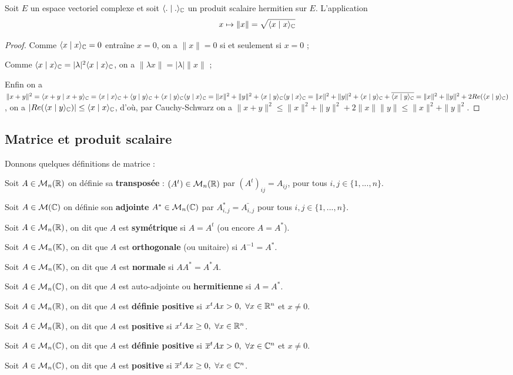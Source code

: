 Soit $E$ un espace vectoriel complexe et soit  $\langle.\mid.\rangle_{\mathbb{C}}$ un produit scalaire hermitien sur $E$. L'application $$x \mapsto \|x\| = \sqrt{\langle x \mid x\rangle_{\mathbb{C}}}$$
\ep
\begin{proof}
	\ben
		\item Comme $\langle x \mid x\rangle_{\mathbb{C}} = 0$ entraîne $x=0$, on a $\|x\|=0$ si et seulement si $x=0$ ;  
		\item Comme $\langle x \mid x\rangle_{\mathbb{C}} = |\lambda |^2\langle x \mid x\rangle_{\mathbb{C}}$, on a $\|\lambda x \| = |\lambda| \|x\|$ ; 
		\item Enfin on a $\|x + y \| ^2 = \langle x+y \mid x+y \rangle_{\mathbb{C}} = \langle x \mid x\rangle_{\mathbb{C}} + \langle y \mid y\rangle_{\mathbb{C}} + \langle x \mid y\rangle_{\mathbb{C}}\langle y \mid x\rangle_{\mathbb{C}} = \|x\|^2 + \|y\| ^2 + \langle x \mid y\rangle_{\mathbb{C}}\langle y \mid x\rangle_{\mathbb{C}} = \|x\|^2 + \|y\|^2 + \langle x \mid y\rangle_{\mathbb{C}}+\overline{\langle x \mid y\rangle_{\mathbb{C}}} = \|x\|^2 + \| y \| ^2 + 2Re(\langle x \mid y\rangle_{\mathbb{C}})$, on a $|Re(\langle x \mid y\rangle_{\mathbb{C}})| \leq \langle x \mid x\rangle_{\mathbb{C}}$, d'où, par Cauchy-Schwarz on a $\|x+y\|^2 \leq \|x\|^2 + \|y\|^2 + 2 \|x\| \|y\| \leq \|x\|^2 +\|y\|^2$.
	\een
\end{proof}

\subsection{Matrice et produit scalaire}
\bd
Donnons quelques définitions de matrice :
\ben
	\item Soit $A \in \mathcal{M}_n(\mathbb{R})$ on définie sa \textbf{transposée} :  $(A^t) \in  \mathcal{M}_n(\mathbb{R})$ par $(A^t)_{ij} = A_{ij}$, pour tous $i,j \in\{1,...,n\}$.
	\item Soit $A \in \mathcal{M}(\mathbb{C})$ on définie son \textbf{adjointe} $A^* \in \mathcal{M}_n(\mathbb{C})$ par $A^*_{i,j} = \bar{A_{i,j}}$ pour tous $i,j \in \{1,...,n\}$.
	\item Soit $A \in \mathcal{M}_n(\mathbb{R})$, on dit que $A$ est \textbf{symétrique} si $A = A^t$ (ou encore $A = A^*$).
	\item Soit $A \in \mathcal{M}_n(\mathbb{K})$, on dit que $A$ est \textbf{orthogonale} (ou unitaire) si $A^{-1} = A^*$.
	\item Soit $A \in \mathcal{M}_n(\mathbb{K})$, on dit que $A$ est \textbf{normale} si $AA^* = A^*A$.
	\item Soit $A \in \mathcal{M}_n(\mathbb{C})$, on dit que $A$ est auto-adjointe ou \textbf{hermitienne} si $A = A^*$. 
	\item Soit $A \in \mathcal{M}_n(\mathbb{R})$, on dit que $A$ est \textbf{définie positive} si $x^tAx > 0, ~ \forall x \in \mathbb{R}^n$ et $x\ne 0$.
	\item Soit $A \in \mathcal{M}_n(\mathbb{R})$, on dit que $A$ est \textbf{positive} si $x^tAx \geq 0, ~ \forall x \in \mathbb{R}^n$.
	\item Soit $A \in \mathcal{M}_n(\mathbb{C})$, on dit que $A$ est \textbf{définie positive} si $\overline{x}^tAx > 0, ~ \forall x \in \mathbb{C}^n$ et $x \ne 0$.
	\item Soit $A \in \mathcal{M}_n(\mathbb{C})$, on dit que $A$ est \textbf{positive} si $\overline{x}^t A x \geq 0, ~ \forall x \in \mathbb{C}^n$.
\een
\ed

